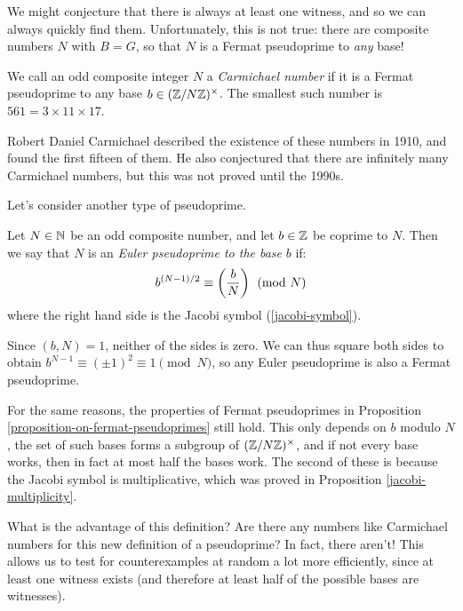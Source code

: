 \documentclass{article}
\begin{document}
\begin{note}
	We might conjecture that there is always at least one witness, and so we can always quickly find them. Unfortunately, this is not true: there are composite numbers $N$ with $B = G$, so that $N$ is a Fermat pseudoprime to \textit{any} base!
\end{note}

\begin{definition}
    We call an odd composite integer $N$ a \textit{Carmichael number} if it is a Fermat pseudoprime to any base $b \in (\mathbb{Z}/N\mathbb{Z})^\times$. The smallest such number is $561 = 3 \times 11 \times 17$.
\end{definition}

\begin{note}
	Robert Daniel Carmichael described the existence of these numbers in 1910, and found the first fifteen of them. He also conjectured that there are infinitely many Carmichael numbers, but this was not proved until the 1990s.
\end{note}

Let's consider another type of pseudoprime.

\begin{definition}
    Let $N \in \mathbb{N}$ be an odd composite number, and let $b \in \mathbb{Z}$ be coprime to $N$. Then we say that $N$ is an \textit{Euler pseudoprime to the base} $b$ if:
    \[
	b^{(N-1)/2} \equiv \left( \frac{b}{N} \right) \pmod N
	\]
	where the right hand side is the Jacobi symbol (\ref{jacobi-symbol}).
\end{definition}

\begin{corollary}
    Since $(b, N) = 1$, neither of the sides is zero. We can thus square both sides to obtain $b^{N-1} \equiv (\pm 1)^2 \equiv 1 \pmod N$, so any Euler pseudoprime is also a Fermat pseudoprime.
\end{corollary}

\begin{corollary}
	For the same reasons, the properties of Fermat pseudoprimes in Proposition \ref{proposition-on-fermat-pseudoprimes} still hold. This only depends on $b$ modulo $N$, the set of such bases forms a subgroup of $(\mathbb{Z}/N\mathbb{Z})^\times$, and if not every base works, then in fact at most half the bases work. The second of these is because the Jacobi symbol is multiplicative, which was proved in Proposition \ref{jacobi-multiplicity}.
\end{corollary}

What is the advantage of this definition? Are there any numbers like Carmichael numbers for this new definition of a pseudoprime? In fact, there aren't! This allows us to test for counterexamples at random a lot more efficiently, since at least one witness exists (and therefore at least half of the possible bases are witnesses).
\end{document}
